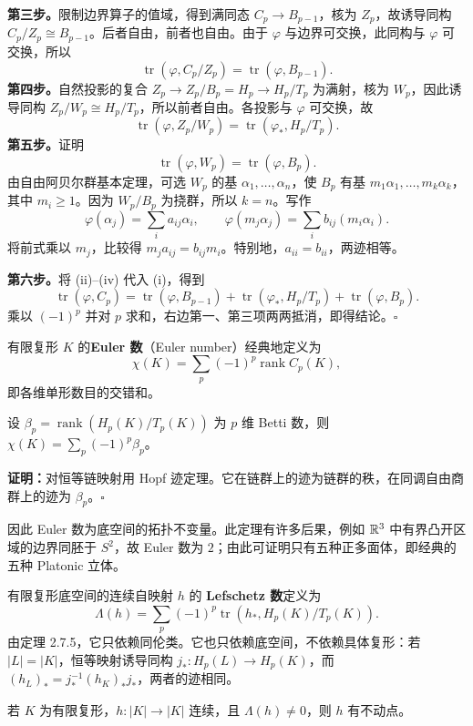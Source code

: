 \textbf{第三步。}限制边界算子的值域，得到满同态 $C_p\to B_{p-1}$，核为 $Z_p$，故诱导同构 $C_p/Z_p\cong B_{p-1}$。后者自由，前者也自由。由于 $\varphi$ 与边界可交换，此同构与 $\varphi$ 可交换，所以
\[
\operatorname{tr}(\varphi,C_p/Z_p)=\operatorname{tr}(\varphi,B_{p-1}).\tag{ii}
\]
\textbf{第四步。}自然投影的复合 $Z_p\to Z_p/B_p=H_p\to H_p/T_p$ 为满射，核为 $W_p$，因此诱导同构 $Z_p/W_p\cong H_p/T_p$，所以前者自由。各投影与 $\varphi$ 可交换，故
\[
\operatorname{tr}(\varphi,Z_p/W_p)=\operatorname{tr}(\varphi_*,H_p/T_p).\tag{iii}
\]
\textbf{第五步。}证明
\[
\operatorname{tr}(\varphi,W_p)=\operatorname{tr}(\varphi,B_p).\tag{iv}
\]
由自由阿贝尔群基本定理，可选 $W_p$ 的基 $\alpha_1,\ldots,\alpha_n$，使 $B_p$ 有基 $m_1\alpha_1,\ldots,m_k\alpha_k$，其中 $m_i\geq1$。因为 $W_p/B_p$ 为挠群，所以 $k=n$。写作
\[
\varphi(\alpha_j)=\sum_i a_{ij}\alpha_i,\qquad
\varphi(m_j\alpha_j)=\sum_i b_{ij}(m_i\alpha_i).
\]
将前式乘以 $m_j$，比较得 $m_ja_{ij}=b_{ij}m_i$。特别地，$a_{ii}=b_{ii}$，两迹相等。

\textbf{第六步。}将 (ii)--(iv) 代入 (i)，得到
\[
\operatorname{tr}(\varphi,C_p)=\operatorname{tr}(\varphi,B_{p-1})
+\operatorname{tr}(\varphi_*,H_p/T_p)+\operatorname{tr}(\varphi,B_p).
\]
乘以 $(-1)^p$ 并对 $p$ 求和，右边第一、第三项两两抵消，即得结论。\hfill$\square$

有限复形 $K$ 的\textbf{Euler 数}（Euler number）经典地定义为
\[
\chi(K)=\sum_p(-1)^p\operatorname{rank}C_p(K),
\]
即各维单形数目的交错和。

设 $\beta_p=\operatorname{rank}(H_p(K)/T_p(K))$ 为 $p$ 维 Betti 数，则 $\chi(K)=\sum_p(-1)^p\beta_p$。

\noindent\textbf{证明：}对恒等链映射用 Hopf 迹定理。它在链群上的迹为链群的秩，在同调自由商群上的迹为 $\beta_p$。\hfill$\square$

因此 Euler 数为底空间的拓扑不变量。此定理有许多后果，例如 $\mathbb{R}^3$ 中有界凸开区域的边界同胚于 $S^2$，故 Euler 数为 $2$；由此可证明只有五种正多面体，即经典的五种 Platonic 立体。

有限复形底空间的连续自映射 $h$ 的 \textbf{Lefschetz 数}定义为
\[
\Lambda(h)=\sum_p(-1)^p\operatorname{tr}(h_*,H_p(K)/T_p(K)).
\]
由定理 2.7.5，它只依赖同伦类。它也只依赖底空间，不依赖具体复形：若 $|L|=|K|$，恒等映射诱导同构 $j_*:H_p(L)\to H_p(K)$，而 $(h_L)_*=j_*^{-1}(h_K)_*j_*$，两者的迹相同。

若 $K$ 为有限复形，$h:|K|\to|K|$ 连续，且 $\Lambda(h)\ne0$，则 $h$ 有不动点。

